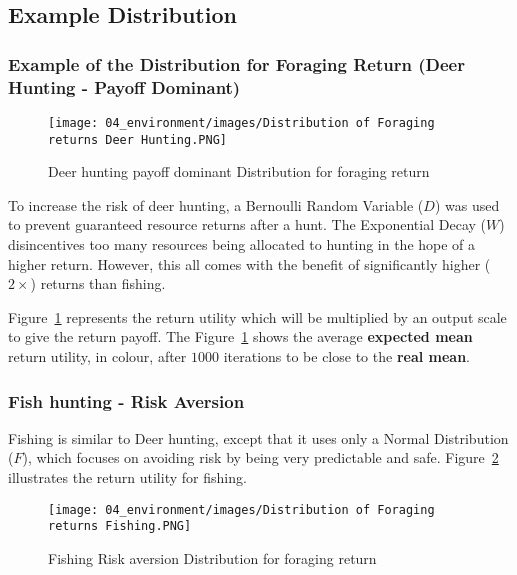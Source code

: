 \subsection{Example Distribution}
\subsubsection{Example of the Distribution for Foraging Return (Deer Hunting - Payoff Dominant)}

\begin{figure}[!htb]
    \centering
    \texttt{[image: 04\_environment/images/Distribution of Foraging returns Deer Hunting.PNG]}
    \caption{Deer hunting payoff dominant Distribution for foraging return}
    \label{fig:Distribution of Foraging returns Deer Hunting}
\end{figure}

To increase the risk of deer hunting, a Bernoulli Random Variable ($D$) was used to prevent guaranteed resource returns after a hunt. The Exponential Decay ($W$) disincentives too many resources being allocated to hunting in the hope of a higher return. However, this all comes with the benefit of significantly higher ($2\times$) returns than fishing.

Figure~\ref{fig:Distribution of Foraging returns Deer Hunting} represents the return utility which will be multiplied by an output scale to give the return payoff. The Figure~\ref{fig:Distribution of Foraging returns Deer Hunting} shows the average \textbf{expected mean} return utility, in colour, after $1000$ iterations to be close to the \textbf{real mean}.

\newpage
\subsubsection{Fish hunting - Risk Aversion}

Fishing is similar to Deer hunting, except that it uses only a Normal Distribution ($F$), which focuses on avoiding risk by being very predictable and safe. Figure~\ref{fig:Distribution of Foraging returns Fishing} illustrates the return utility for fishing.

\begin{figure}[!htb]
    \centering
    \texttt{[image: 04\_environment/images/Distribution of Foraging returns Fishing.PNG]}
    \caption{Fishing Risk aversion Distribution for foraging return}
    \label{fig:Distribution of Foraging returns Fishing}
\end{figure}

